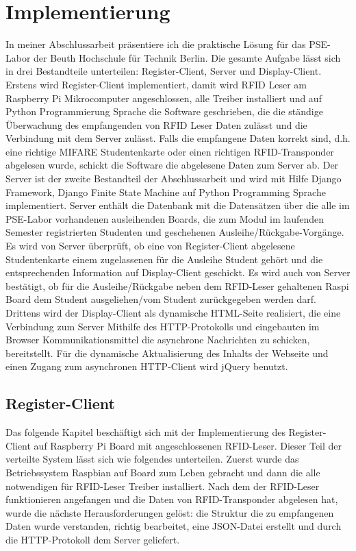 \chapter{Implementierung}
In meiner Abschlussarbeit präsentiere ich die praktische Lösung für das PSE-Labor der Beuth Hochschule für Technik Berlin. Die gesamte Aufgabe lässt sich in drei Bestandteile unterteilen: Register-Client, Server und Display-Client. Erstens wird Register-Client implementiert, damit wird RFID Leser am Raspberry Pi Mikrocomputer angeschlossen, alle Treiber installiert und auf Python Programmierung Sprache die Software geschrieben, die die ständige Überwachung des empfangenden von RFID Leser Daten zulässt und die Verbindung mit dem Server zulässt. Falls die empfangene Daten korrekt sind, d.h.  eine richtige MIFARE Studentenkarte oder einen richtigen RFID-Transponder abgelesen wurde, schickt die Software die abgelesene Daten zum Server ab. Der Server ist der zweite Bestandteil der Abschlussarbeit und wird mit Hilfe Django Framework, Django Finite State Machine auf Python Programming Sprache implementiert. Server enthält die Datenbank mit die Datensätzen über die alle im PSE-Labor vorhandenen ausleihenden Boards, die zum Modul im laufenden Semester registrierten Studenten und  geschehenen Ausleihe/Rückgabe-Vorgänge. Es wird von Server überprüft, ob eine von Register-Client abgelesene Studentenkarte einem zugelassenen für die Ausleihe Student gehört und die entsprechenden Information auf Display-Client geschickt. Es wird auch von Server bestätigt, ob für die Ausleihe/Rückgabe neben dem RFID-Leser gehaltenen Raspi Board dem Student ausgeliehen/vom Student zurückgegeben werden darf. Drittens wird der Display-Client als dynamische HTML-Seite realisiert, die eine Verbindung zum Server Mithilfe des HTTP-Protokolls und eingebauten im Browser Kommunikationsmittel die asynchrone Nachrichten zu schicken, bereitstellt. Für die dynamische Aktualisierung des Inhalts der Webseite und einen Zugang zum asynchronen HTTP-Client wird jQuery benutzt.
\section{Register-Client}
\label{sec:register_client}
Das folgende Kapitel beschäftigt sich mit der Implementierung des Register-Client auf Raspberry Pi Board mit angeschlossenen RFID-Leser. Dieser Teil der verteilte System lässt sich wie folgendes unterteilen. Zuerst wurde das Betriebssystem Raspbian auf Board zum Leben gebracht und dann die alle notwendigen für RFID-Leser Treiber installiert. Nach dem der RFID-Leser funktionieren angefangen und die Daten von RFID-Transponder abgelesen hat, wurde die nächste Herausforderungen gelöst: die Struktur die zu empfangenen Daten wurde verstanden, richtig bearbeitet, eine JSON-Datei erstellt und durch die HTTP-Protokoll dem Server geliefert. 

